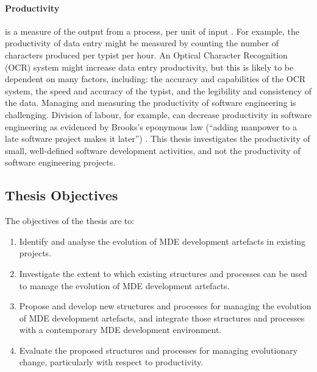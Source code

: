 \paragraph{Productivity} is a measure of the output from a process, per unit of input \cite{beattie07economics}. For example, the productivity of data entry might be measured by counting the number of characters produced per typist per hour. An Optical Character Recognition (OCR) system might increase data entry productivity, but this is likely to be dependent on many factors, including: the accuracy and capabilities of the OCR system, the speed and accuracy of the typist, and the legibility and consistency of the data. Managing and measuring the productivity of software engineering is challenging. Division of labour, for example, can decrease productivity in software engineering as evidenced by Brooks's eponymous law (``adding manpower to a late software project makes it later'') \cite{brooks95mythical}. This thesis investigates the productivity of small, well-defined software development activities, and not the productivity of software engineering projects.

\subsection{Thesis Objectives}
The objectives of the thesis are to:

\begin{enumerate}
	\item Identify and analyse the evolution of MDE development artefacts in existing projects.
	\item Investigate the extent to which existing structures and processes can be used to manage the evolution of MDE development artefacts. 
	\item Propose and develop new structures and processes for managing the evolution of MDE development artefacts, and integrate those structures and processes with a contemporary MDE development environment.
	\item Evaluate the proposed structures and processes for managing evolutionary change, particularly with respect to productivity.
\end{enumerate}
